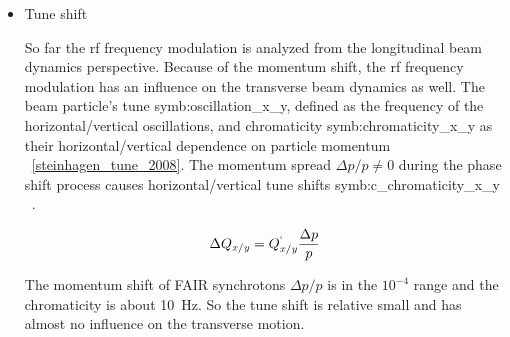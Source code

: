 \begin{itemize}
%
%


	\item Tune shift

So far the rf frequency modulation is analyzed from the longitudinal beam dynamics perspective. Because of the momentum shift, the rf frequency modulation has an influence on the transverse beam dynamics as well. The beam particle’s tune \gls{symb:oscillation_x_y}, defined as the frequency of the horizontal/vertical oscillations, and chromaticity \gls{symb:chromaticity_x_y} as their horizontal/vertical dependence on particle momentum ~\ref{steinhagen_tune_2008}. The momentum spread ${\Delta{p}}/{p} \neq 0$ during the phase shift process causes horizontal/vertical tune shifts \gls{symb:c_chromaticity_x_y} ~\cite{holzer_introduction_2013}.

\begin{equation}
\Delta{Q_{\mathit{x/y}}} = Q^`_{\mathit{x/y}}\frac{\Delta{p}}{p}
\label{eq:chromaticity_x}
\end{equation} 

The momentum shift of FAIR synchrotons $\Delta p/p$ is in the $10^{-4}$ range and the chromaticity is about \SI{10}{Hz}. So the tune shift is relative small and has almost no influence on the transverse motion.

\end{itemize}

